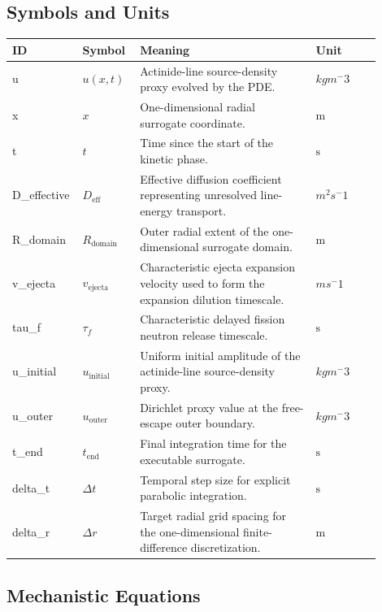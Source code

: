\documentclass[11pt]{article}
\begin{document}
\subsection{Symbols and Units}

\begin{center}
\small
\begin{tabular}{|p{0.12\linewidth}|p{0.15\linewidth}|p{0.46\linewidth}|p{0.17\linewidth}|}
\hline
ID & Symbol & Meaning & Unit \\ \hline
u & $u(x,t)$ & Actinide-line source-density proxy evolved by the PDE. & $kg m^-3$ \\ \hline
x & $x$ & One-dimensional radial surrogate coordinate. & $\mathrm{m}$ \\ \hline
t & $t$ & Time since the start of the kinetic phase. & $\mathrm{s}$ \\ \hline
D\_effective & $D_{\mathrm{eff}}$ & Effective diffusion coefficient representing unresolved line-energy transport. & $m^2 s^-1$ \\ \hline
R\_domain & $R_{\mathrm{domain}}$ & Outer radial extent of the one-dimensional surrogate domain. & $\mathrm{m}$ \\ \hline
v\_ejecta & $v_{\mathrm{ejecta}}$ & Characteristic ejecta expansion velocity used to form the expansion dilution timescale. & $m s^-1$ \\ \hline
tau\_f & $\tau_f$ & Characteristic delayed fission neutron release timescale. & $\mathrm{s}$ \\ \hline
u\_initial & $u_{\mathrm{initial}}$ & Uniform initial amplitude of the actinide-line source-density proxy. & $kg m^-3$ \\ \hline
u\_outer & $u_{\mathrm{outer}}$ & Dirichlet proxy value at the free-escape outer boundary. & $kg m^-3$ \\ \hline
t\_end & $t_{\mathrm{end}}$ & Final integration time for the executable surrogate. & $\mathrm{s}$ \\ \hline
delta\_t & $\Delta t$ & Temporal step size for explicit parabolic integration. & $\mathrm{s}$ \\ \hline
delta\_r & $\Delta r$ & Target radial grid spacing for the one-dimensional finite-difference discretization. & $\mathrm{m}$ \\ \hline
\end{tabular}
\end{center}

\subsection{Mechanistic Equations}
\end{document}
